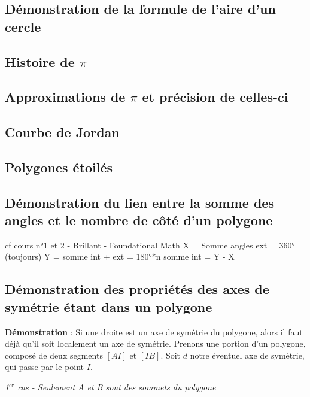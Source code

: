 \documentclass[a4paper, twoside]{article}
\begin{document}
\subsection*{Démonstration de la formule de l'aire d'un cercle} \label{demo_formule_aire_cercle}


\subsection*{Histoire de $\pi$} \label{histoire_de_pi}

\subsection*{Approximations de $\pi$ et précision de celles-ci} \label{approximations_pi}

\subsection*{Courbe de Jordan} \label{courbe_Jordan}

\subsection*{Polygones étoilés} \label{polygone_etoile}

\subsection*{Démonstration du lien entre la somme des angles et le nombre de côté d'un polygone} \label{demo_formule_lien_somme_angle_nb_cote}

cf cours n°1 et 2 - Brillant - Foundational Math
X = Somme angles ext = 360° (toujours)
Y = somme int + ext = 180°*n
somme int = Y - X


\subsection*{Démonstration des propriétés des axes de symétrie étant dans un polygone} \label{demo_axes_symétrie_polygone}

\textbf{Démonstration} : Si une droite est un axe de symétrie du polygone,
alors il faut déjà qu'il soit localement un axe de symétrie.
Prenons une portion d'un polygone, composé de deux segments $[AI]$ et $[IB]$.
Soit $d$ notre éventuel axe de symétrie, qui passe par le point $I$.

\smallbreak

\textit{1$^{\text{er}}$ cas - Seulement A et B sont des sommets du polygone}
\end{document}

